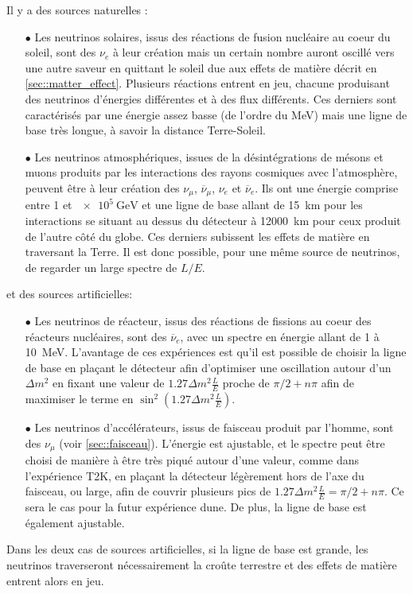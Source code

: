 		     Il y a des sources naturelles :
		    \begin{itemize}
		    	\item[$\bullet$] Les neutrinos solaires, issus des réactions de fusion nucléaire au coeur du soleil, sont des $\nu_e$ à leur création mais un certain nombre auront oscillé vers une autre saveur en quittant le soleil due aux effets de matière décrit en \autoref{sec::matter_effect}. Plusieurs réactions entrent en jeu, chacune produisant des neutrinos d'énergies différentes et à des flux différents. %
		    	Ces derniers sont caractérisés par une énergie assez basse (de l'ordre du \si{\mega\electronvolt}) mais une ligne de base très longue, à savoir la distance Terre-Soleil.
		    	\item[$\bullet$] Les neutrinos atmosphériques, issues de la désintégrations de mésons et muons produits par les interactions des rayons cosmiques avec l'atmosphère, peuvent être à leur création des $\nu_{\mu}$, $\overline{\nu}_{\mu}$, $\nu_e$ et $\overline{\nu}_e$. Ils ont une énergie comprise entre 1 et $\SI{e5}{\giga\electronvolt}$ et une ligne de base allant de \SI{15}{\kilo\meter} pour les interactions se situant au dessus du détecteur à \SI{12000}{\kilo\meter} pour ceux produit de l'autre côté du globe. Ces derniers subissent les effets de matière en traversant la Terre. Il est donc possible, pour une même source de neutrinos, de regarder un large spectre de $L/E$. %
		    \end{itemize}
		    et des sources artificielles:
		    \begin{itemize}
		    	\item[$\bullet$] Les neutrinos de réacteur, issus des réactions de fissions au coeur des réacteurs nucléaires, sont des $\overline{\nu}_e$, avec un spectre en énergie allant de 1 à \SI{10}{\mega\electronvolt}.
		    	L'avantage de ces expériences est qu'il est possible de choisir la ligne de base en plaçant le détecteur afin d'optimiser une oscillation autour d'un $\Delta m^2$ en fixant une valeur de $1.27\Delta m^2\frac{L}{E}$ proche de $\pi/2+n\pi$ afin de maximiser le terme en $\sin^2(1.27\Delta m^2\frac{L}{E})$.
		    	\item[$\bullet$] Les neutrinos d'accélérateurs, issus de faisceau produit par l'homme, sont des $\nu_{\mu}$ (voir \autoref{sec::faisceau}). L'énergie est ajustable, et le spectre peut être choisi de manière à être très piqué autour d'une valeur, comme dans l'expérience T2K, en plaçant la détecteur légèrement hors de l'axe du faisceau\cite{McDonald2001}, ou large, afin de couvrir plusieurs pics de $1.27\Delta m^2\frac{L}{E}=\pi/2+n\pi$. Ce sera le cas pour la futur expérience \gls{dune}. De plus, la ligne de base est également ajustable.
		    \end{itemize}
		    Dans les deux cas de sources artificielles, si la ligne de base est grande, les neutrinos traverseront nécessairement la croûte terrestre et des effets de matière entrent alors en jeu.
		    
